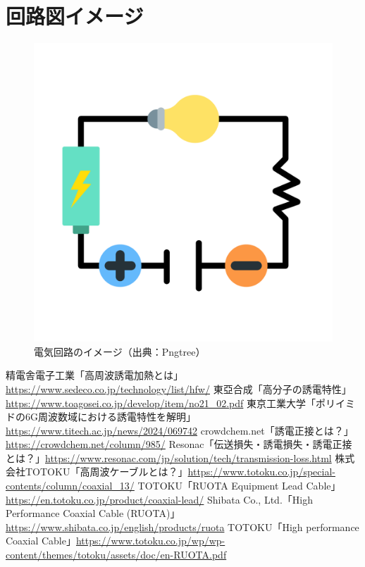 \documentclass[11pt,a4paper]{ltjsarticle} %
\begin{document}
\section{回路図イメージ}
\begin{figure}[htbp]
  \centering
  \includegraphics[width=0.6\linewidth]{—Pngtree—electrical circuit_8178136.png}
  \caption{電気回路のイメージ（出典：Pngtree）}
  \label{fig:circuit_image}
\end{figure}

\begin{thebibliography}{99}
 精電舎電子工業「高周波誘電加熱とは」\url{https://www.sedeco.co.jp/technology/list/hfw/}
 東亞合成「高分子の誘電特性」\url{https://www.toagosei.co.jp/develop/item/no21_02.pdf}
 東京工業大学「ポリイミドの6G周波数域における誘電特性を解明」\url{https://www.titech.ac.jp/news/2024/069742}
 crowdchem.net「誘電正接とは？」\url{https://crowdchem.net/column/985/}
 Resonac「伝送損失・誘電損失・誘電正接とは？」\url{https://www.resonac.com/jp/solution/tech/transmission-loss.html}
 株式会社TOTOKU「高周波ケーブルとは？」\url{https://www.totoku.co.jp/special-contents/column/coaxial_13/}
 TOTOKU「RUOTA Equipment Lead Cable」\url{https://en.totoku.co.jp/product/coaxial-lead/}
 Shibata Co., Ltd.「High Performance Coaxial Cable (RUOTA)」\url{https://www.shibata.co.jp/english/products/ruota}
 TOTOKU「High performance Coaxial Cable」\url{https://www.totoku.co.jp/wp/wp-content/themes/totoku/assets/doc/en-RUOTA.pdf}
\end{thebibliography}
\end{document}
